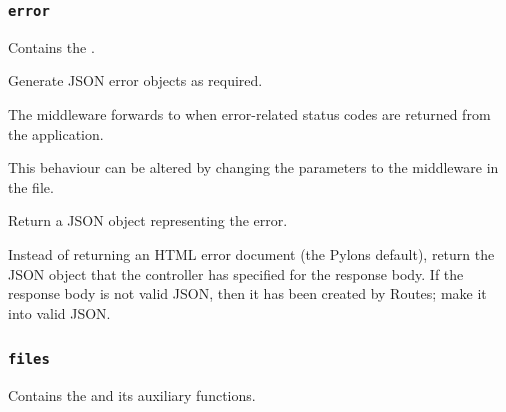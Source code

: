 \documentclass[letterpaper,10pt,english]{sphinxmanual}
\begin{document}
\subsubsection{\texttt{error}}
\label{api:module-onlinelinguisticdatabase.controllers.error}\label{api:error}
Contains the {\hyperref[api:onlinelinguisticdatabase.controllers.error.ErrorController]{}}.
\label{api:module-error}

\begin{fulllineitems}
\label{api:onlinelinguisticdatabase.controllers.error.ErrorController}
Generate JSON error objects as required.

The  middleware forwards to  when
error-related status codes are returned from the application.

This behaviour can be altered by changing the parameters to the
 middleware in the  file.

\begin{fulllineitems}
\label{api:onlinelinguisticdatabase.controllers.error.ErrorController.document}
Return a JSON object representing the error.

Instead of returning an HTML error document (the Pylons default),
return the JSON object that the controller has specified for the
response body.  If the response body is not valid JSON, then it has been
created by Routes; make it into valid JSON.

\end{fulllineitems}


\end{fulllineitems}



\subsubsection{\texttt{files}}
\label{api:files}\label{api:module-onlinelinguisticdatabase.controllers.files}
Contains the {\hyperref[api:onlinelinguisticdatabase.controllers.files.FilesController]{}} and its auxiliary functions.
\label{api:module-files}
\end{document}
